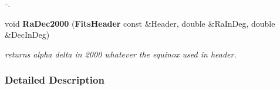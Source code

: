 \begin{CompactItemize}
\begin{CompactList}\small\item\em -.\item\end{CompactList}\item 
{}
void {\bf Ra\-Dec2000} ({\bf Fits\-Header} const \&Header, double \&Ra\-In\-Deg, double \&Dec\-In\-Deg)\label{astroutils_h_a12}

\begin{CompactList}\small\item\em returns alpha delta in 2000 whatever the equinox used in header.\item\end{CompactList}\end{CompactItemize}


\subsubsection{Detailed Description}


